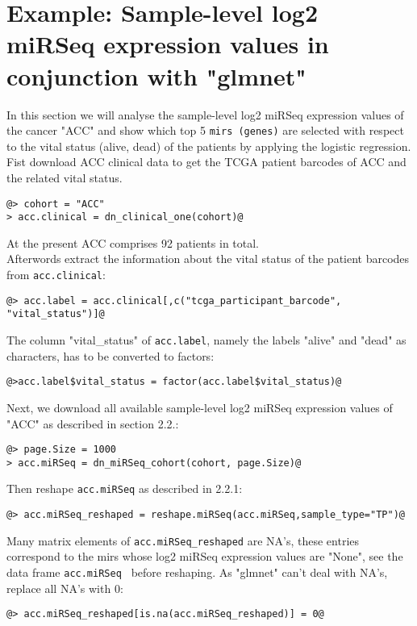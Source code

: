 \documentclass{TechReport}
\begin{document}
\section{Example: Sample-level log2 miRSeq expression values in conjunction with
"glmnet"}
In this section we will analyse the sample-level log2 miRSeq expression values of
the cancer "ACC" and show which top 5
{\tt mirs (genes)} are selected with respect to the vital status (alive, dead) of
the patients by applying the logistic 
regression.\\
Fist download ACC clinical data to get the TCGA patient barcodes of ACC and the
related vital status.
\begin{lstlisting}[style=base]
@> cohort = "ACC"
> acc.clinical = dn_clinical_one(cohort)@
\end{lstlisting}
At the present ACC comprises 92 patients in total.\\ 
Afterwords extract the information about the vital status of the patient barcodes
from {\tt acc.clinical}:
\begin{lstlisting}[style=base]
@> acc.label = acc.clinical[,c("tcga_participant_barcode",
"vital_status")]@
\end{lstlisting}
The column "vital\_status" of {\tt acc.label}, namely the labels "alive" and "dead" as characters, 
has to be converted to factors:
\begin{lstlisting}[style=base]
@>acc.label$vital_status = factor(acc.label$vital_status)@
\end{lstlisting}
Next, we download all available sample-level log2 miRSeq expression values of "ACC"
as described in section 2.2.:
\begin{lstlisting}[style=base]
@> page.Size = 1000
> acc.miRSeq = dn_miRSeq_cohort(cohort, page.Size)@
\end{lstlisting}
Then reshape {\tt acc.miRSeq} as described in 2.2.1:
\begin{lstlisting}[style=base]
@> acc.miRSeq_reshaped = reshape.miRSeq(acc.miRSeq,sample_type="TP")@
\end{lstlisting}
Many matrix elements of {\tt acc.miRSeq\_reshaped} are NA's, these entries correspond
to the mirs whose log2 miRSeq expression values are "None", see the data frame {\tt acc.miRSeq }
before reshaping. As "glmnet" can't deal with NA's, replace all NA's with 0:
\begin{lstlisting}[style=base]
@> acc.miRSeq_reshaped[is.na(acc.miRSeq_reshaped)] = 0@
\end{lstlisting}
\end{document}
